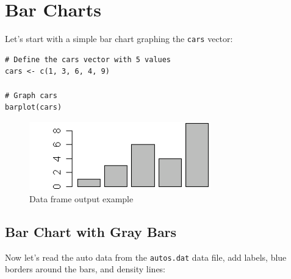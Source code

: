\documentclass[10pt]{book}
\begin{document}
\section*{Bar Charts}

Let's start with a simple bar chart graphing the \texttt{cars} vector:

\begin{lstlisting}
# Define the cars vector with 5 values
cars <- c(1, 3, 6, 4, 9)

# Graph cars
barplot(cars)
\end{lstlisting}
\begin{figure}[H]
    \begin{flushleft}
        \includegraphics[width=0.7\textwidth]{bar_script1.png}
        \caption{Data frame output example}
        \label{fig:dataframe}
    \end{flushleft}
\end{figure}



\subsection*{Bar Chart with Gray Bars}
Now let's read the auto data from the \texttt{autos.dat} data file, add labels, blue borders around the bars, and density lines:
\end{document}

